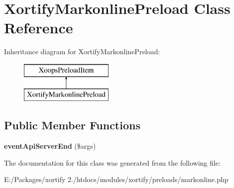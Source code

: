 \hypertarget{class_xortify_markonline_preload}{\section{Xortify\-Markonline\-Preload Class Reference}
\label{class_xortify_markonline_preload}
}
Inheritance diagram for Xortify\-Markonline\-Preload\-:\begin{figure}[H]
\begin{center}
\leavevmode
\includegraphics[height=2.000000cm]{class_xortify_markonline_preload}
\end{center}
\end{figure}
\subsection*{Public Member Functions}
\begin{DoxyCompactItemize}
\item 
\hypertarget{class_xortify_markonline_preload_a0ca031f78fab2485be7c0b8bf43a0f11}{{\bfseries event\-Api\-Server\-End} (\$args)}\label{class_xortify_markonline_preload_a0ca031f78fab2485be7c0b8bf43a0f11}

\end{DoxyCompactItemize}


The documentation for this class was generated from the following file\-:\begin{DoxyCompactItemize}
\item 
E\-:/\-Packages/xortify 2./htdocs/modules/xortify/preloads/markonline.\-php\end{DoxyCompactItemize}
